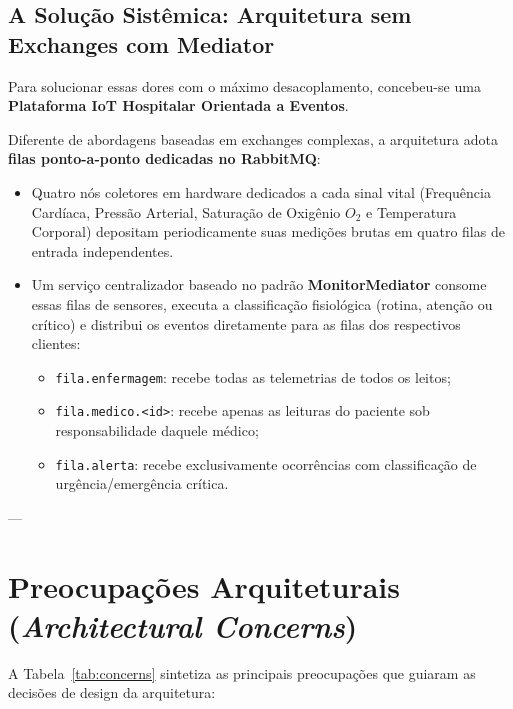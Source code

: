 \documentclass[12pt,a4paper]{article}
\begin{document}
\subsection{A Solução Sistêmica: Arquitetura sem Exchanges com Mediator}
Para solucionar essas dores com o máximo desacoplamento, concebeu-se uma \textbf{Plataforma IoT Hospitalar Orientada a Eventos}. 

Diferente de abordagens baseadas em exchanges complexas, a arquitetura adota \textbf{filas ponto-a-ponto dedicadas no RabbitMQ}:
\begin{itemize}
    \item Quatro nós coletores em hardware dedicados a cada sinal vital (Frequência Cardíaca, Pressão Arterial, Saturação de Oxigênio $O_2$ e Temperatura Corporal) depositam periodicamente suas medições brutas em quatro filas de entrada independentes.
    \item Um serviço centralizador baseado no padrão \textbf{MonitorMediator} consome essas filas de sensores, executa a classificação fisiológica (rotina, atenção ou crítico) e distribui os eventos diretamente para as filas dos respectivos clientes:
    \begin{itemize}
        \item \texttt{fila.enfermagem}: recebe todas as telemetrias de todos os leitos;
        \item \texttt{fila.medico.<id>}: recebe apenas as leituras do paciente sob responsabilidade daquele médico;
        \item \texttt{fila.alerta}: recebe exclusivamente ocorrências com classificação de urgência/emergência crítica.
    \end{itemize}
\end{itemize}

---

\section{Preocupações Arquiteturais (\textit{Architectural Concerns})}

A Tabela~\ref{tab:concerns} sintetiza as principais preocupações que guiaram as decisões de design da arquitetura:
\end{document}
